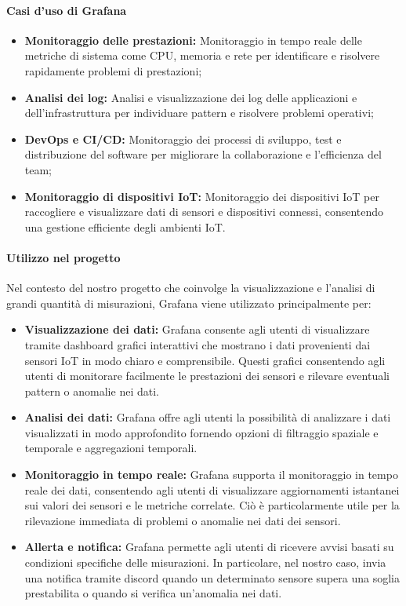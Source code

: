\paragraph{Casi d'uso di Grafana}
\begin{itemize}
    \item \textbf{Monitoraggio delle prestazioni:} Monitoraggio in tempo reale delle metriche di sistema come CPU, memoria e rete per identificare e risolvere rapidamente problemi di prestazioni;
    
    \item \textbf{Analisi dei log:} Analisi e visualizzazione dei log delle applicazioni e dell'infrastruttura per individuare pattern e risolvere problemi operativi;
    
    \item \textbf{DevOps e CI/CD:} Monitoraggio dei processi di sviluppo, test e distribuzione del software per migliorare la collaborazione e l'efficienza del team;
    
    \item \textbf{Monitoraggio di dispositivi IoT:} Monitoraggio dei dispositivi IoT per raccogliere e visualizzare dati di sensori e dispositivi connessi, consentendo una gestione efficiente degli ambienti IoT.
\end{itemize}

\paragraph{Utilizzo nel progetto}
Nel contesto del nostro progetto che coinvolge la visualizzazione e l'analisi di grandi quantità di misurazioni, Grafana viene utilizzato principalmente per:

\begin{itemize}
  \item \textbf{Visualizzazione dei dati:} Grafana consente agli utenti di visualizzare tramite dashboard grafici interattivi che mostrano i dati provenienti dai sensori IoT in modo chiaro e comprensibile. Questi grafici consentendo agli utenti di monitorare facilmente le prestazioni dei sensori e rilevare eventuali pattern o anomalie nei dati.
  
  \item \textbf{Analisi dei dati:} Grafana offre agli utenti la possibilità di analizzare i dati visualizzati in modo approfondito fornendo opzioni di filtraggio spaziale e temporale e aggregazioni temporali.
  
  \item \textbf{Monitoraggio in tempo reale:} Grafana supporta il monitoraggio in tempo reale dei dati, consentendo agli utenti di visualizzare aggiornamenti istantanei sui valori dei sensori e le metriche correlate. Ciò è particolarmente utile per la rilevazione immediata di problemi o anomalie nei dati dei sensori.
  
  \item \textbf{Allerta e notifica:} Grafana permette agli utenti di ricevere avvisi basati su condizioni specifiche delle misurazioni. In particolare, nel nostro caso, invia una notifica tramite discord quando un determinato sensore supera una soglia prestabilita o quando si verifica un'anomalia nei dati.
\end{itemize} 